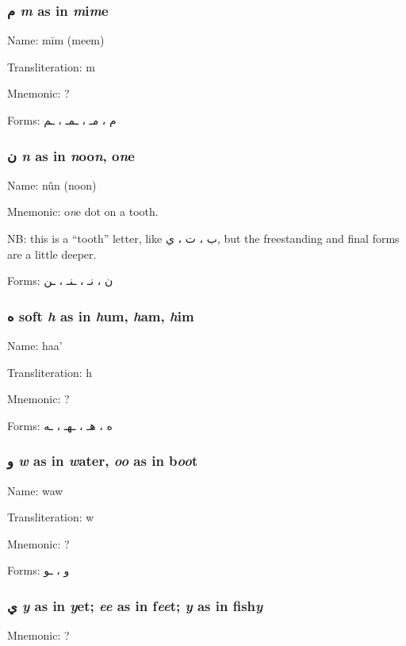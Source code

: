 \documentclass[11pt]{article}
\begin{document}
\subsubsection{ \textarabic{م} \textit{m} as in \textit{m}i\textit{m}e}

\noindent Name: mīm (meem)

\noindent Transliteration: m

\noindent Mnemonic:  ?

\noindent Forms: \textarabic{م ، مـ ، ـمـ ، ـم}

\subsubsection{ \textarabic{ن}  \textit{n} as in \textit{n}oo\textit{n}, o\textit{n}e}

\noindent Name: nûn (noon)

Mnemonic:  o\textit{n}e dot on a tooth.

NB: this is a “tooth” letter, like \textarabic{ب ، ت ، ي}, but the
freestanding and final forms are a little deeper.

\noindent Forms: \textarabic{ن ، نـ ، ـنـ ، ـن}

\subsubsection{ \textarabic{ه} soft \textit{h} as in  \textit{h}um, \textit{h}am, \textit{h}im }

\noindent Name: haa'

\noindent Transliteration: h

\noindent Mnemonic:  ?

\noindent Forms: \textarabic{ه ، هـ ، ـهـ ، ـه}

\subsubsection{ \textarabic{و} \textit{w} as in  \textit{w}ater,
  \textit{oo} as in b\textit{oo}t}

\noindent Name: waw

\noindent Transliteration: w

\noindent Mnemonic:  ?

\noindent Forms: \textarabic{و ، ـو}

\subsubsection{\textarabic{ي}  \textit{y} as in \textit{y}et;
  \textit{ee} as in f\textit{ee}t; \textit{y} as in fish\textit{y}}
Mnemonic:  ?
\end{document}
